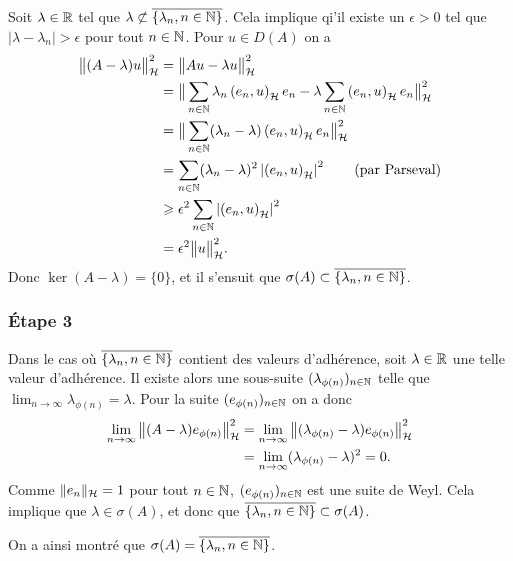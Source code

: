 Soit $\lambda \in \mathbb{R}$ tel que
$\lambda \not\subset \overline{\{ \lambda_n, {n \in \mathbb{N}} \}}$.
Cela implique qi'il existe un $\epsilon > 0$ tel que
$|\lambda - \lambda_n| > \epsilon$ pour tout ${n \in \mathbb{N}}$.
Pour $u \in D(A)$ on a
\begin{align}
    \normeh{(A - \lambda)u}^2 &= \normeh{Au - \lambda u}^2 \\
    &= \normeh{\sum_\inn{n} \lambda_n \psh{e_n}{u} e_n
    - \lambda \sum_\inn{n} \psh{e_n}{u} e_n}^2 \\
    &= \normeh{\sum_\inn{n} (\lambda_n - \lambda) \psh{e_n}{u} e_n}^2 \\
    &= \sum_\inn{n} (\lambda_n - \lambda)^2 \left| \psh{e_n}{u} \right|^2
    \qquad (\text{par Parseval}) \\
%
    & \geqslant \epsilon^2 \sum_\inn{n} \left| \psh{e_n}{u} \right|^2 \\
    &= \epsilon^2 \normeh{u}^2.
\end{align}
%
Donc $\ker(A - \lambda) = \{0\}$, et il s'ensuit que
$\sigma(A) \subset \overline{ \{ \lambda_n, {n \in \mathbb{N}} \} }$.

\subsubsection*{Étape 3}

Dans le cas où $\overline{ \{ \lambda_n, {n \in \mathbb{N}} \} }$
contient des valeurs d'adhérence,
soit $\lambda \in \mathbb{R}$ une telle valeur d'adhérence. Il existe alors
une sous-suite $(\lambda_{\phi(n)})_{{n \in \mathbb{N}}}$ telle que
$\lim_{n \rightarrow \infty} \lambda_{\phi(n)} = \lambda$.
Pour la suite $(e_{\phi(n)})_{{n \in \mathbb{N}}}$ on a donc
\begin{align}
    \lim_{n \rightarrow \infty} \normeh{(A - \lambda) e_{\phi(n)}}^2
    &= \lim_{n \rightarrow \infty}
    \normeh{(\lambda_{\phi(n)} - \lambda) e_{\phi(n)}}^2 \\
%
    &= \lim_{n \rightarrow \infty}(\lambda_{\phi(n)} - \lambda)^2 = 0.
\end{align}
%
Comme $\| e_n \|_{\mathcal{H}} = 1$ pour tout ${n \in \mathbb{N}}$, $(e_{\phi(n)})_{{n \in \mathbb{N}}}$
est une suite de Weyl. Cela implique que $\lambda \in \sigma(A)$, et
donc que $\overline{ \{ \lambda_n, {n \in \mathbb{N}} \} } \subset \sigma(A)$.

On a ainsi montré que
$\sigma(A) = \overline{ \{ \lambda_n, {n \in \mathbb{N}} \} }$.








